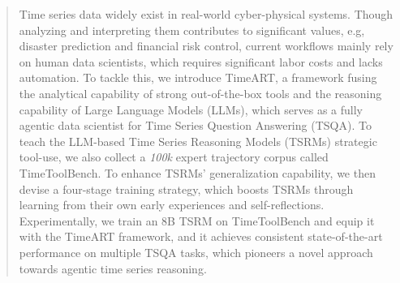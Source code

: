 \documentclass{article}
\theoremstyle{plain}
\theoremstyle{definition}
\theoremstyle{remark}
\begin{document}
\begin{abstract}
Time series data widely exist in real-world cyber-physical systems. Though analyzing and interpreting them contributes to significant values, e.g, disaster prediction and financial risk control, current workflows mainly rely on human data scientists, which requires significant labor costs and lacks automation. To tackle this, we introduce TimeART, a framework fusing the analytical capability of strong out-of-the-box tools and the reasoning capability of Large Language Models (LLMs), which serves as a fully agentic data scientist for Time Series Question Answering (TSQA). To teach the LLM-based Time Series Reasoning Models (TSRMs) strategic tool-use, we also collect a \textit{100k} expert trajectory corpus called TimeToolBench. To enhance TSRMs' generalization capability, we then devise a four-stage training strategy, which boosts TSRMs through learning from their own early experiences and self-reflections. Experimentally, we train an 8B TSRM on TimeToolBench and equip it with the TimeART framework, and it achieves consistent state-of-the-art performance on multiple TSQA tasks, which pioneers a novel approach towards agentic time series reasoning.

\end{abstract}

















\clearpage
\appendix

\end{document}
